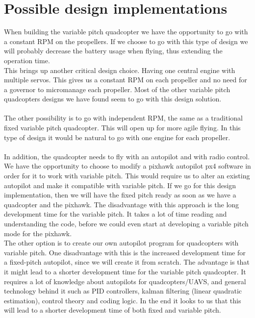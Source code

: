 \section{Possible design implementations}

When building the variable pitch quadcopter we have the opportunity to go with a constant RPM on the propellers. If we choose to go with this type of design we will probably decrease the battery usage when flying, thus extending the operation time.  \\
This brings up another critical design choice. Having one central engine with multiple servos. This gives us a constant RPM on each propeller and no need for a governor to micromanage each propeller. Most of the other variable pitch quadcopters designs we have found seem to go with this design solution. 
\\\\
The other possibility is to go with independent RPM, the same as a traditional fixed variable pitch quadcopter. This will open up for more agile flying. In this type of design it would be natural to go with one engine for each propeller. 
\\\\
In addition, the quadcopter needs to fly with an autopilot and with radio control. We have the opportunity to choose to modify a pixhawk autopilot px4 software in order for it to work with variable pitch. This would require us to alter an existing autopilot and make it compatible with variable pitch. If we go for this design implementation, then we will have the fixed pitch ready as soon as we have a quadcopter and the pixhawk. The disadvantage with this approach is the long development time for the variable pitch. It takes a lot of time reading and understanding the code, before we could even start at developing a variable pitch mode for the pixhawk. 
\\
The other option is to create our own autopilot program for quadcopters with variable pitch. One disadvantage with this is the increased development time for a fixed-pitch autopilot, since we will create it from scratch. The advantage is that it might lead to a shorter development time for the variable pitch quadcopter. It requires a lot of knowledge about autopilots for quadcopters/UAVS, and general technology behind it such as PID controllers, kalman filtering (linear quadratic estimation), control theory and coding logic. In the end it looks to us that this will lead to a shorter development time of both fixed and variable pitch.
